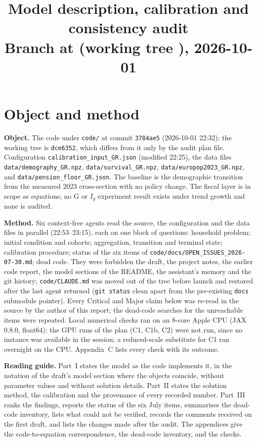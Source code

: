 \documentclass[11pt,a4paper]{article}
\title{\vspace{-1.4cm}Model description, calibration and consistency audit\\[2pt]
\large Branch \code{trend-growth} at \code{3784ae5} (working tree \code{dce6352}), 2026-10-01}
\author{}
\date{}
\newcommand{\code}[1]{\texttt{#1}}
\begin{document}
\maketitle
\vspace{-1.2cm}

\section*{Object and method}

\textbf{Object.} The code under \code{code/} at commit \code{3784ae5} (2026-10-01 22:32); the working tree is \code{dce6352}, which differs from it only by the audit plan file. Configuration \code{calibration_input_GR.json} (modified 22:25), the data files \code{data/demography_GR.npz}, \code{data/survival_GR.npz}, \code{data/europop2023_GR.npz}, and \code{data/pension_floor_GR.json}. The baseline is the demographic transition from the measured 2023 cross-section with no policy change. The fiscal layer is in scope as equations; no G or $I_g$ experiment result exists under trend growth and none is audited.

\textbf{Method.} Six context-free agents read the source, the configuration and the data files in parallel (22:53--23:15), each on one block of questions: household problem; initial condition and cohorts; aggregation, transition and terminal state; calibration procedure; status of the six items of \code{code/docs/OPEN_ISSUES_2026-07-30.md}; dead code. They were forbidden the draft, the project notes, the earlier code report, the model sections of the README, the assistant's memory and the git history; \code{code/CLAUDE.md} was moved out of the tree before launch and restored after the last agent returned (\code{git status} clean apart from the pre-existing \code{docs} submodule pointer). Every Critical and Major claim below was re-read in the source by the author of this report; the dead-code searches for the unreachable items were repeated. Local numerical checks ran on an 8-core Apple CPU (JAX 0.8.0, float64); the GPU runs of the plan (C1, C1b, C2) were not run, since no instance was available in the session; a reduced-scale substitute for C1 ran overnight on the CPU. Appendix~C lists every check with its outcome.

\textbf{Reading guide.} Part~I states the model as the code implements it, in the notation of the draft's model section where the objects coincide, without parameter values and without solution details. Part~II states the solution method, the calibration and the provenance of every recorded number. Part~III ranks the findings, reports the status of the six July items, summarises the dead-code inventory, lists what could not be verified, records the comments received on the first draft, and lists the changes made after the audit. The appendices give the code-to-equation correspondence, the dead-code inventory, and the checks.
\end{document}
